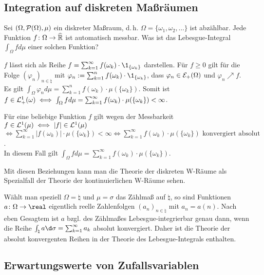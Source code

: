 \subsection{%
    Integration auf diskreten Maßräumen%
}

\begin{Bem}
    Sei $(\Omega, \P(\Omega), \mu)$ ein diskreter Maßraum, d.\,h.
    $\Omega = \{\omega_1, \omega_2, \dotsc\}$ ist abzählbar.
    Jede Funktion $f\colon \Omega \rightarrow \extreal$ ist automatisch messbar.
    Was ist das Lebesgue-Integral $\int_\Omega f d\mu$ einer solchen Funktion?

    $f$ lässt sich als Reihe $f = \sum_{k=1}^\infty f(\omega_k) \cdot \1_{\{\omega_k\}}$
    darstellen.
    Für $f \ge 0$ gilt für die Folge $(\varphi_n)_{n \in \natural}$ mit
    $\varphi_n := \sum_{k=1}^n f(\omega_k) \cdot \1_{\{\omega_k\}}$,
    dass $\varphi_n \in \E_+(\Omega)$ und $\varphi_n \nearrow f$.
    Es gilt $\int_\Omega \varphi_n d\mu = \sum_{k=1}^n f(\omega_k) \cdot \mu(\{\omega_k\})$.
    Somit ist $f \in \L^1_+(\omega) \iff
    \int_\Omega f d\mu = \sum_{k=1}^\infty f(\omega_k) \cdot \mu(\{\omega_k\}) < \infty$.

    Für eine beliebige Funktion $f$ gilt wegen der Messbarkeit
    $f \in \L^1(\mu) \iff |f| \in \L^1(\mu)$
    $\iff \sum_{k=1}^\infty |f(\omega_k)| \cdot \mu(\{\omega_k\}) < \infty \iff
    \sum_{k=1}^\infty f(\omega_k) \cdot \mu(\{\omega_k\}) \text{ konvergiert absolut}$.\\
    In diesem Fall gilt
    $\int_\Omega f d\mu = \sum_{k=1}^\infty f(\omega_k) \cdot \mu(\{\omega_k\})$.

    Mit diesen Beziehungen kann man die Theorie der diskreten W-Räume als Spezialfall der Theorie
    der kontinuierlichen W-Räume sehen.

    Wählt man speziell $\Omega = \natural$ und $\mu = \sigma$ das Zählmaß auf $\natural$,
    so sind Funktionen $a\colon \Omega \rightarrow \real$ eigentlich reelle Zahlenfolgen
    $(a_n)_{n \in \natural}$ mit $a_n = a(n)$.
    Nach eben Gesagtem ist $a$ bzgl. des Zählmaßes Lebesgue-integrierbar genau dann, wenn
    die Reihe $\int_\natural a \d\sigma = \sum_{k=1}^\infty a_k$ absolut konvergiert.
    Daher ist die Theorie der absolut konvergenten Reihen in der Theorie des
    Lebesgue-Integrals enthalten.
\end{Bem}

\pagebreak

\subsection{%
    Erwartungswerte von Zufallsvariablen%
}

